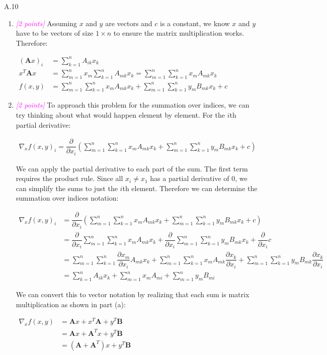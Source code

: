 \documentclass{article}
\newcommand{\1}{\mathbf{1}}
\newcommand{\mat}[1]{\boldsymbol{#1}} %
\newcommand{\points}[1]{\small\textcolor{magenta}{\emph{[#1 points]}} \normalsize}
\begin{document}
A.10 
\begin{enumerate}
	\item \points{2} Assuming $x$ and $y$ are vectors and $c$ is a constant, we know $x$ and $y$ have to be vectors of size $1\times n$ to ensure the matrix multiplication works. Therefore:
	\begin{center}
		$\begin{aligned}(\mat{A}x)_i&=\sum_{k=1}^{n}A_{ik}x_k\\
		x^T\mat{A}x&=\sum_{m=1}^{n}x_m\sum_{k=1}^{n}A_{mk}x_k=\sum_{m=1}^{n}\sum_{k=1}^{n}x_mA_{mk}x_k\\
		f(x,y)&=\sum_{m=1}^{n}\sum_{k=1}^{n}x_mA_{mk}x_k+\sum_{m=1}^{n}\sum_{k=1}^{n}y_mB_{mk}x_k+c\end{aligned}$
	\end{center}
	\item \points{2} To approach this problem for the summation over indices, we can try thinking about what would happen element by element. For the $i$th partial derivative:
	\begin{center}
			$\begin{aligned}\nabla_{x}f(x,y)_i=\dfrac{\partial}{\partial x_i}\left(\sum_{m=1}^{n}\sum_{k=1}^{n}x_mA_{mk}x_k+\sum_{m=1}^{n}\sum_{k=1}^{n}y_mB_{mk}x_k+c\right)\end{aligned}$
	\end{center}
	We can apply the partial derivative to each part of the sum. The first term requires the product rule. Since all $x_i \neq x_1$ has a partial derivative of $0$, we can simplify the sums to just the $i$th element. Therefore we can determine the summation over indices notation:
	\begin{center}
		$\begin{aligned}\nabla_{x}f(x,y)_i&=\dfrac{\partial}{\partial x_i}\left(\sum_{m=1}^{n}\sum_{k=1}^{n}x_mA_{mk}x_k+\sum_{m=1}^{n}\sum_{k=1}^{n}y_mB_{mk}x_k+c\right)\\
		&= \dfrac{\partial}{\partial x_i}\sum_{m=1}^{n}\sum_{k=1}^{n}x_mA_{mk}x_k +  \dfrac{\partial}{\partial x_i}\sum_{m=1}^{n}\sum_{k=1}^{n}y_mB_{mk}x_k +\dfrac{\partial}{\partial x_i}c\\
		&= \sum_{m=1}^{n}\sum_{k=1}^{n}\dfrac{\partial x_m}{\partial x_i}A_{mk}x_k + \sum_{m=1}^{n}\sum_{k=1}^{n}x_mA_{mk}\dfrac{\partial x_k}{\partial x_i} + \sum_{m=1}^{n}\sum_{k=1}^{n}y_mB_{mk}\dfrac{\partial x_k}{\partial x_i}\\
		&= \sum_{k=1}^{n}A_{ik}x_k + \sum_{m=1}^{n}x_mA_{mi} + \sum_{m=1}^{n}y_mB_{mi}\end{aligned}$
	\end{center}
	We can convert this to vector notation by realizing that each sum is matrix multiplication as shown in part (a):
	\begin{center}
		$\begin{aligned}\nabla_{x}f(x,y)&= \mat{A}x+x^T\mat{A}+y^T\mat{B}\\
		&= \mat{A}x+\mat{A}^Tx+y^T\mat{B}\\
		&= \left( \mat{A}+\mat{A}^T \right)x+y^T\mat{B} \end{aligned}$
	\end{center}


\end{enumerate}
\end{document}
